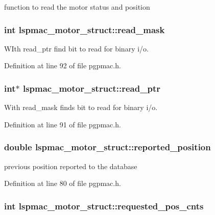 function to read the motor status and position \hypertarget{structlspmac__motor__struct_a3c24ed30c5a3ad490c6139b2780b2af7}{
\subsubsection[{read\_\-mask}]{\setlength{\rightskip}{0pt plus 5cm}int {\bf lspmac\_\-motor\_\-struct::read\_\-mask}}}
\label{structlspmac__motor__struct_a3c24ed30c5a3ad490c6139b2780b2af7}


WIth read\_\-ptr find bit to read for binary i/o. 

Definition at line 92 of file pgpmac.h.\hypertarget{structlspmac__motor__struct_a844b28ccabab5048ca216db074fb9704}{
\subsubsection[{read\_\-ptr}]{\setlength{\rightskip}{0pt plus 5cm}int$\ast$ {\bf lspmac\_\-motor\_\-struct::read\_\-ptr}}}
\label{structlspmac__motor__struct_a844b28ccabab5048ca216db074fb9704}


With read\_\-mask finds bit to read for binary i/o. 

Definition at line 91 of file pgpmac.h.\hypertarget{structlspmac__motor__struct_ae5f1f605a0f587500e627332ad4e5e7e}{
\subsubsection[{reported\_\-position}]{\setlength{\rightskip}{0pt plus 5cm}double {\bf lspmac\_\-motor\_\-struct::reported\_\-position}}}
\label{structlspmac__motor__struct_ae5f1f605a0f587500e627332ad4e5e7e}


previous position reported to the database 

Definition at line 80 of file pgpmac.h.\hypertarget{structlspmac__motor__struct_a6e8dc9c11dc52a439fe9837230f93ce2}{
\subsubsection[{requested\_\-pos\_\-cnts}]{\setlength{\rightskip}{0pt plus 5cm}int {\bf lspmac\_\-motor\_\-struct::requested\_\-pos\_\-cnts}}}
\label{structlspmac__motor__struct_a6e8dc9c11dc52a439fe9837230f93ce2}


